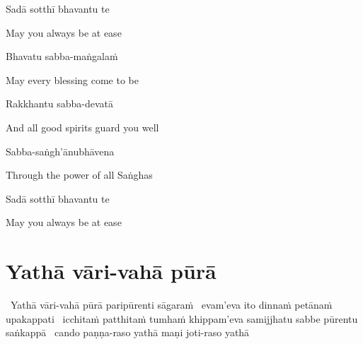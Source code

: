 Sadā sotthī bhavantu te

\begin{english}
  May you always be at ease
\end{english}

Bhavatu sabba-maṅgalaṁ

\begin{english}
  May every blessing come to be
\end{english}

Rakkhantu sabba-devatā

\begin{english}
  And all good spirits guard you well
\end{english}

Sabba-saṅgh'ānubhāvena

\begin{english}
  Through the power of all Saṅghas
\end{english}

Sadā sotthī bhavantu te

\begin{english}
  May you always be at ease
\end{english}



\clearpage

\setsecheadstyle{\subsectionFmt}
\section{Yathā vāri-vahā pūrā}
\label{yatha-vari-vaha-pura}

\vspace{-0.99em}

\anglebracketleft\ \hspace{-0.5mm}Yathā vāri-vahā pūrā paripūrenti sāgaraṁ \breathmark\ evam'eva ito dinnaṁ petānaṁ upakappati \breathmark\ icchitaṁ patthitaṁ tumhaṁ khippam'eva samijjhatu sabbe pūrentu saṅkappā \breathmark\ cando paṇṇa-raso yathā maṇi joti-raso yathā\makeatletter\hyperlink{endnote119-appendix}\makeatother \thinspace\hspace{-0.5mm}\anglebracketright\

